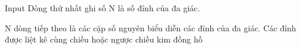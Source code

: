 Input
Dòng thứ nhất ghi số N là số đỉnh của đa giác.  

   N dòng tiếp theo là các cặp số nguyên biểu diễn các đỉnh của đa giác. Các đỉnh được liệt kê cùng chiều hoặc ngược chiều kim đồng hồ